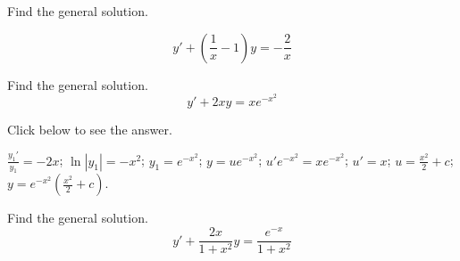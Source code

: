 \documentclass{ximera}
\begin{document}
\begin{problem}\label{exer:2.1.13} Find
the general solution. 

$$y'+\left(\frac{1}{x}-1\right)y=-\frac{2}{x}$$



\end{problem}

\begin{problem}\label{exer:2.1.14} Find
the general solution. 
$$y'+2xy=xe^{-x^2}$$



Click below to see the answer.

\begin{expandable}
    $\frac{y_1'}{ y_1}=-2x$;\quad
$\ln|y_1|=-x^2$;\quad
$y_1=e^{-x^2}$;\quad
$y=ue^{-x^2}$;\quad
$u'e^{-x^2}=xe^{-x^2}$;\quad
$u'=x$;\quad
$u=\frac{x^2}{2}+c$;\quad
$y=e^{-x^2}\left(\frac{x^2}{2}+c\right)$.

\end{expandable}
\end{problem}

\begin{problem}\label{exer:2.1.15} Find
the general solution. 
$$y'+\frac{2x}{1+x^2}y=\frac{e^{-x}}{1+x^2}$$



\end{problem}
\end{document}

